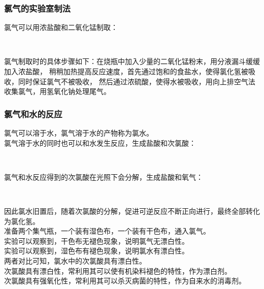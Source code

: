 \documentclass[UTF8]{ctexart}
\begin{document}
\newpage

\subsubsection{氯气的实验室制法}
    氯气可以用浓盐酸和二氧化锰制取：
    \begin{center}
        \\[6mm]
    \end{center}
    氯气制取时的具体步骤如下：在烧瓶中加入少量的二氧化锰粉末，用分液漏斗缓缓加入浓盐酸，
    稍稍加热提高反应速度，首先通过饱和的食盐水，使得氯化氢被吸收，同时保证氯气不被吸收，
    然后通过浓硫酸，使得水被吸收，用向上排空气法收集氯气，用氢氧化钠处理尾气。

\subsubsection{氯气和水的反应}
    氯气可以溶于水，氯气溶于水的产物称为氯水。\\[3mm]
    氯气溶于水的同时也可以和水发生反应，生成盐酸和次氯酸：
    \begin{center}
        \\[6mm]
    \end{center}
    氯气和水反应得到的次氯酸在光照下会分解，生成盐酸和氧气：
    \begin{center}
        \\[6mm]
    \end{center}
    因此氯水旧置后，随着次氯酸的分解，促进可逆反应不断正向进行，最终全部转化为氯化氢。\\[6mm]
    准备两个集气瓶，一个装有湿色布，一个装有干色布，通入氯气。\\[3mm]
    实验可以观察到，干色布无褪色现象，说明氯气无漂白性。\\[3mm]
    实验可以观察到，湿色布有褪色现象，说明氯水有漂白性。\\[3mm]
    两者对比可知，氯水中的次氯酸具有漂白性。\\[6mm]
    次氯酸具有漂白性，常利用其可以使有机染料褪色的特性，作为漂白剂。\\[3mm]
    次氯酸具有强氧化性，常利用其可以杀灭病菌的特性，作为自来水的消毒剂。

\newpage
\end{document}
